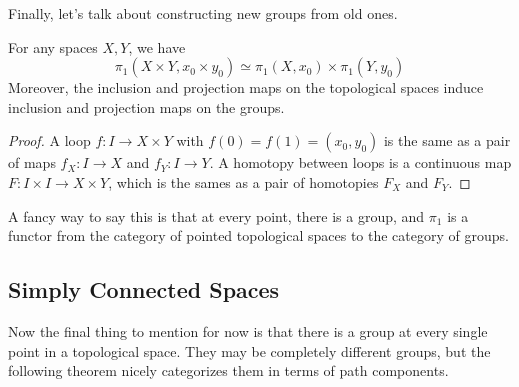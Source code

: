   Finally, let's talk about constructing new groups from old ones. 

  \begin{theorem}
    For any spaces $X, Y$, we have 
    \begin{equation}
      \pi_1 (X \times Y, x_0 \times y_0) \simeq \pi_1 (X, x_0) \times \pi_1 (Y, y_0)
    \end{equation}
    Moreover, the inclusion and projection maps on the topological spaces induce inclusion and projection maps on the groups. 
  \end{theorem}
  \begin{proof}
    A loop $f: I \to X \times Y$  with $f(0) = f(1) = (x_0, y_0)$ is the same as a pair of maps $f_X : I \to X$ and $f_Y : I \to Y$. A homotopy between loops is a continuous map $F: I \times I \to X \times Y$, which is the sames as a pair of homotopies $F_X$ and $F_Y$. 
  \end{proof}

  A fancy way to say this is that at every point, there is a group, and $\pi_1$ is a functor from the category of pointed topological spaces to the category of groups. 

\subsection{Simply Connected Spaces} 

  Now the final thing to mention for now is that there is a group at every single point in a topological space. They may be completely different groups, but the following theorem nicely categorizes them in terms of path components. 

